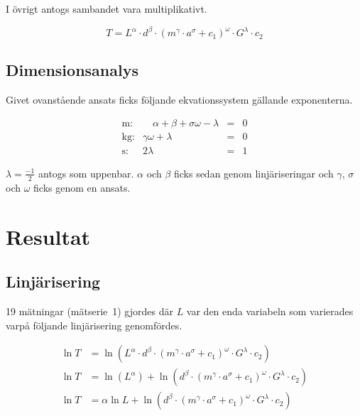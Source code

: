 \documentclass[a4paper,12pt]{article}
\begin{document}
I övrigt antogs sambandet vara multiplikativt.

\begin{equation}
  T = L^\alpha \cdot d^\beta \cdot (m^\gamma \cdot a^\sigma + c_1)^\omega \cdot G^\lambda \cdot c_2
\end{equation}

\subsection{Dimensionsanalys}

Givet ovanstående ansats ficks följande ekvationssystem gällande exponenterna.

\begin{equation}
  \begin{array}{rrcc}
    \text{m:} & \hspace{1em} \alpha + \beta + \sigma \omega - \lambda & = & 0 \\
    \text{kg:} & \gamma \omega + \lambda & = & 0 \\
    \text{s:} & 2\lambda & = & 1
  \end{array}
  \label{eq:system}
\end{equation}

$\lambda = \frac{-1}{2}$ antogs som uppenbar. $\alpha$ och $\beta$ ficks sedan genom
linjäriseringar och $\gamma$, $\sigma$ och $\omega$ ficks genom en ansats.


\section{Resultat}

\subsection{Linjärisering}

19 mätningar (mätserie~1) gjordes där $L$ var den enda variabeln som varierades
varpå följande linjärisering genomfördes.

\begin{align}
  \ln T &= \ln (L^\alpha \cdot d^\beta \cdot (m^\gamma \cdot a^\sigma + c_1)^\omega \cdot G^\lambda \cdot c_2) \nonumber \\
  \ln T &= \ln (L^\alpha) + \ln (d^\beta \cdot (m^\gamma \cdot a^\sigma + c_1)^\omega \cdot G^\lambda \cdot c_2) \nonumber \\
  \ln T &= \alpha \ln L + \ln (d^\beta \cdot (m^\gamma \cdot a^\sigma + c_1)^\omega \cdot G^\lambda \cdot c_2)  \label{eq:lin_La}
\end{align}
\end{document}
